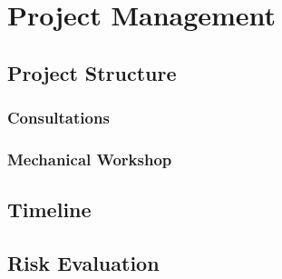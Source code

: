 
\chapter{Project Management}\label{pm}


\section{Project Structure}\label{pm/structure}

\subsection{Consultations}\label{pm/consultations}

\subsection{Mechanical Workshop}\label{pm/mechshop}



\section{Timeline}\label{pm/timeline}



\section{Risk Evaluation}\label{pm/riskeval}
